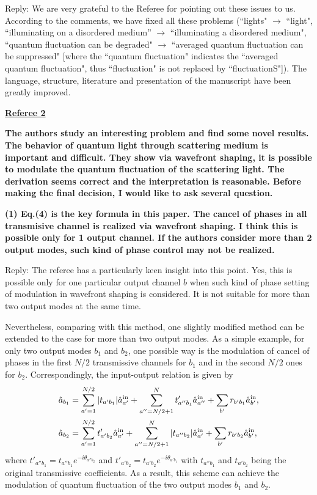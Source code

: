 \documentclass[10pt]{article}
\begin{document}
Reply: We are very grateful to the Referee for pointing out these issues to us. According to the comments, we have fixed all these problems (``lights" $\to$ ``light", ``illuminating on a disordered medium” $\to$ ``illuminating a disordered medium", ``quantum fluctuation can be degraded" $\to$ ``averaged quantum fluctuation can be suppressed" [where the ``quantum fluctuation" indicates the ``averaged quantum fluctuation", thus ``fluctuation" is not replaced by ``fluctuationS"]).  The language, structure, literature and presentation of the manuscript have been greatly improved.

\newpage

\begin{center}
{\uline{\bf{Referee 2}}}
\end{center}
{\bf{The authors study an interesting problem and find some novel results. The behavior of quantum light through scattering medium is important and difficult. They show via wavefront shaping, it is possible to modulate the quantum fluctuation of the scattering light. The derivation seems correct and the interpretation is reasonable. Before making the final decision, I would like to ask several question.
}}

{\bf{(1) Eq.(4) is the key formula in this paper. The cancel of phases in all transmisive channel is realized via wavefront shaping. I think this is possible only for 1 output channel. If the authors consider more than 2 output modes, such kind of phase control may not be realized.}}

Reply: The referee has a particularly keen insight into this point. Yes, this is possible only for one particular output channel $b$ when such kind of phase setting of modulation in wavefront shaping is considered. It is not suitable for more than two output modes at the same time. 

Nevertheless, comparing with this method, one slightly modified method can be extended to the case for more than two output modes. As a simple example, for only two output modes $b_1$ and $b_2$, one possible way is the modulation of cancel of phases in the first $N/2$ transmissive channels for $b_1$ and in the second $N/2$ ones for $b_2$. Correspondingly, the input-output relation is given by
\begin{align}
\hat{a}_{b_1} &= \sum_{a'=1}^{N/2} |t_{a'b_1}| \hat{a}^{\rm{in}}_{a'} + \sum_{a''=N/2+1}^{N} t'_{a''b_1} \hat{a}^{\rm{in}}_{a''} + \sum_{b'} r_{b'b_1} \hat{a}^{\rm{in}}_{b'}, \nonumber \\
\hat{a}_{b_2} &= \sum_{a'=1}^{N/2} t'_{a'b_2} \hat{a}^{\rm{in}}_{a'} + \sum_{a''=N/2+1}^{N} |t_{a''b_2}| \hat{a}^{\rm{in}}_{a'} + \sum_{b'} r_{b'b_2} \hat{a}^{\rm{in}}_{b'},
\end{align}
where $t'_{a''b_1} = t_{a''b_1} e^{-i \theta_{a''b_2}}$ and $t'_{a'b_2} = t_{a'b_2} e^{-i \theta_{a'b_1}}$ with $t_{a''b_1}$ and $t_{a'b_2}$ being the original transmissive coefficients. As a result, this scheme can achieve the modulation of quantum fluctuation of the two output modes $b_1$ and $b_2$. 
\end{document}
